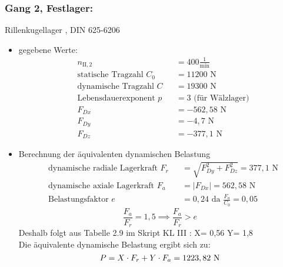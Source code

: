 \subsubsection{Gang 2, Festlager:} Rillenkugellager , DIN 625-6206\\
\begin{itemize}
	\item gegebene Werte:
	\begin{align*}
	&n_{{\mathord{\mathrm{II}},2}} &&=  400 \frac{1}{\text{min}} \\
	&\text{statische Tragzahl } C_{0} &&= 11200 \text{ N}\\
	&\text{dynamische Tragzahl } C &&= 19300 \text{ N} \\
	&\text{Lebensdauerexponent } p &&= 3 \text{ (für Wälzlager)} \\
	&F_{Dx} && = -562,58 \text{ N}\\
	&F_{Dy} && = -4,7 \text{ N}\\
	&F_{Dz} && = -377,1 \text{ N}
	\end{align*} 
	\item Berechnung der äquivalenten dynamischen Belastung
	\begin{align*}
	&\text{dynamische radiale Lagerkraft } F_r&& = \sqrt{F_{Dy}^2 + F_{Dz}^2 } = 377,1 \text{ N} \\
	&\text{dynamische axiale Lagerkraft } F_a&& = |F_{Dx}| = 562,58 \text{ N}\\
	&\text{Belastungsfaktor } e &&= 0,24 \text{ da } \frac{F_a}{C_0} = 0,05
	\end{align*}
	\[\frac{F_a}{F_r} = 1,5 \implies \frac{F_a}{F_r} > e\]
	Deshalb folgt aus Tabelle 2.9 im Skript KL III : X= 0,56 \text{, } Y= 1,8 \\
	Die äquivalente dynamische Belastung ergibt sich zu: 
	\[
	P= X \cdot F_r + Y \cdot F_a = 1223,82 \text{ N}
	\]
\end{itemize}
\newpage

